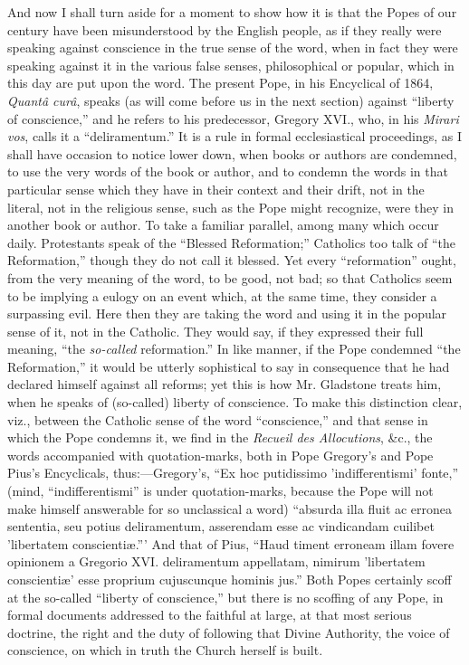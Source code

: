 And now I shall turn aside for a moment to show how it is that
the Popes of our century have been misunderstood by the English people,
as if they really were speaking against conscience in the true sense of
the word, when in fact they were speaking against it in the various
false senses, philosophical or popular, which in this day are put upon
the word. The present Pope, in his Encyclical of 1864, \emph{Quantâ curâ},
speaks (as will come before us in the next section) against
``liberty of conscience,'' and he refers to his predecessor,
Gregory XVI., who, in his \emph{Mirari vos}, calls it a ``deliramentum.''
It is a rule in formal ecclesiastical proceedings, as I shall have
occasion to notice lower down, when books or authors are condemned, to
use the very words of the book or author, and to condemn the words in
that particular sense which they have in their context and their drift,
not in the literal, not in the religious sense, such as the Pope might
recognize, were they in another book or author. To take a familiar
parallel, among many which occur daily. Protestants speak of the
``Blessed Reformation;'' Catholics too talk of ``the
Reformation,'' though they do not call it blessed. Yet every
``reformation'' ought, from the very meaning of the word, to be
good, not bad; so that Catholics seem to be implying a eulogy on an
event which, at the same time, they consider a surpassing evil. Here
then they are taking the word and using it in the popular sense of it,
not in the Catholic. They would say, if they expressed their full
meaning, ``the \emph{so-called} reformation.'' In like manner,
if the Pope condemned ``the Reformation,'' it would be utterly
sophistical to say in consequence that he had declared himself against
all reforms; yet this is how Mr. Gladstone treats him, when he
speaks of (so-called) liberty of conscience. To make this distinction
clear, viz., between the Catholic sense of the word
``conscience,'' and that sense in which the Pope condemns it, we
find in the \emph{Recueil des Allocutions}, \&c., the words
accompanied with quotation-marks, both in Pope Gregory's and Pope Pius's
Encyclicals, thus:—Gregory's, ``Ex hoc putidissimo 'indifferentismi'
fonte,'' (mind, ``indifferentismi'' is under
quotation-marks, because the Pope will not make himself answerable for
so unclassical a word) ``absurda illa fluit ac erronea sententia,
seu potius deliramentum, asserendam esse ac vindicandam cuilibet 'libertatem
conscientiæ.''' And that of Pius, ``Haud timent erroneam illam
fovere opinionem a Gregorio XVI. deliramentum appellatam, nimirum 'libertatem
conscientiæ' esse proprium cujuscunque hominis jus.'' Both Popes
certainly scoff at the so-called ``liberty of conscience,'' but
there is no scoffing of any Pope, in formal documents addressed to the
faithful at large, at that most serious doctrine, the right and the duty
of following that Divine Authority, the voice of conscience, on which in
truth the Church herself is built.


